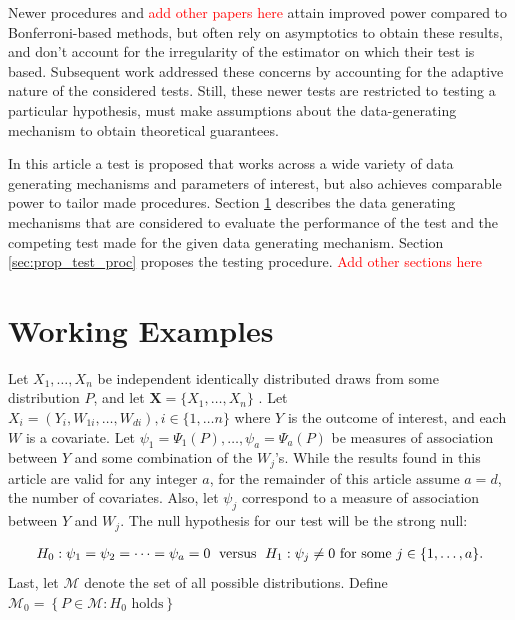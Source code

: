\documentclass{article}
\newcommand{\sh}{\textcolor{red}}
\newcommand{\rvo}{X}
\newcommand{\disto}{P}
\begin{document}
Newer procedures \citep{donoho_higher_2004} and \sh{add other papers here} attain improved power compared to Bonferroni-based methods, but often rely on asymptotics to obtain these results, and don't account for the irregularity of the estimator on which their test is based.  Subsequent work \citep{mckeague_adaptive_2015, pan_powerful_2014, xu_adaptive_2016} addressed these concerns by accounting for the adaptive nature of the considered tests. Still, these newer tests are restricted to testing a particular hypothesis, 
must make assumptions about the data-generating mechanism to obtain theoretical guarantees.

In this article a test is proposed that works across a wide variety of data generating mechanisms and parameters of interest, but also achieves comparable power to tailor made procedures. Section \ref{sec:Working Examples} describes the data generating mechanisms that are considered to evaluate the performance of the test and the competing test made for the given data generating mechanism.  Section \ref{sec:prop_test_proc} proposes the testing procedure. \sh{Add other sections here}  

\section{Working Examples}
\label{sec:Working Examples}
Let $\rvo_1, \dots, \rvo_n$ be independent identically distributed draws from some distribution $\disto$, and let $\boldsymbol{\rvo} = \{\rvo_1, \dots, \rvo_n\}$ . Let $\rvo_i = \left(Y_i, W_{1 i}, \dots, W_{d i}\right), i \in \{1, \dots n\}$ where $Y$ is the outcome of interest, and each $W$ is a covariate. Let $\psi_1 = \Psi_1(\disto), \dots, \psi_a = \Psi_a(\disto)$ be measures of association between $Y$ and some combination of the $W_j$'s.  While the results found in this article are valid for any integer $a$, for the remainder of this article assume $a = d$, the number of covariates. Also, let $\psi_j$ correspond to a measure of association between $Y$ and $W_j$.  The null hypothesis for our test will be the strong null: 

\begin{align*}
H_0: \psi_1 = \psi_2 = \dots = \psi_a = 0 \hspace{0.1cm}\text{  versus  } \hspace{0.1cm} H_1: \psi_j \neq 0 \text{ for some } j \in \{1, \dots, a\}.
\end{align*}
Last, let $\mathscr{M}$ denote the set of all possible distributions.  Define $\mathscr{M}_0 = \left\{ \disto \in \mathscr{M} : H_0 \text{ holds}  \right\}$
\end{document}
